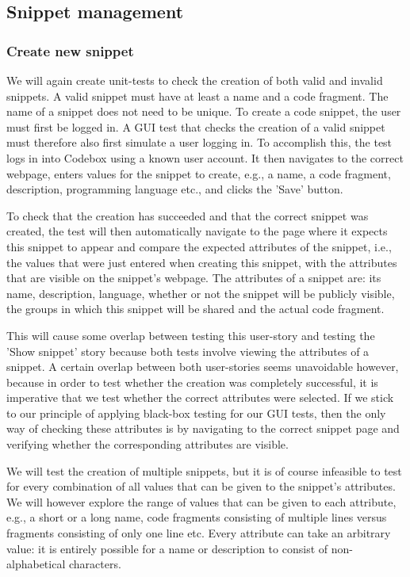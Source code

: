 \documentclass[10pt,a4paper,BCOR12mm, headexclude, footexclude,
  twoside, openright]{scrartcl}
\numberwithin{equation}{section} %
\numberwithin{figure}{section} %
\numberwithin{table}{section} %
\begin{document}
\subsection{Snippet management}

\subsubsection*{Create new snippet}
We will again create unit-tests to check the creation of both valid and invalid snippets.
A valid snippet must have at least a name and a code fragment. The name of a snippet does not need to be unique.
To create a code snippet, the user must first be logged in.
A GUI test that checks the creation of a valid snippet must therefore also first simulate a user logging in.
To accomplish this, the test logs in into Codebox using a known user account. It then navigates to the correct webpage, enters values for the snippet to create, e.g., a name, a code fragment, description, programming language etc., and clicks the 'Save' button.

To check that the creation has succeeded and that the correct snippet was created, the test will then automatically navigate to the page where it expects this snippet to appear and compare the expected attributes of the snippet, i.e., the values that were just entered when creating this snippet, with the attributes that are visible on the snippet's webpage.
The attributes of a snippet are: its name, description, language, whether or not the snippet will be publicly visible, the groups in which this snippet will be shared and the actual code fragment.

This will cause some overlap between testing this user-story and testing the 'Show snippet' story because both tests involve viewing the attributes of a snippet.
A certain overlap between both user-stories seems unavoidable however, because in order to test whether the creation was completely successful, it is imperative that we test whether the correct attributes were selected.
If we stick to our principle of applying black-box testing for our GUI tests, then the only way of checking these attributes is by navigating to the correct snippet page and verifying whether the corresponding attributes are visible.

We will test the creation of multiple snippets, but it is of course infeasible to test for every combination of all values that can be given to the snippet's attributes.
We will however explore the range of values that can be given to each attribute, e.g., a short or a long name, code fragments consisting of multiple lines versus fragments consisting of only one line etc.
Every attribute can take an arbitrary value: it is entirely possible for a name or description to consist of non-alphabetical characters.
\end{document}
